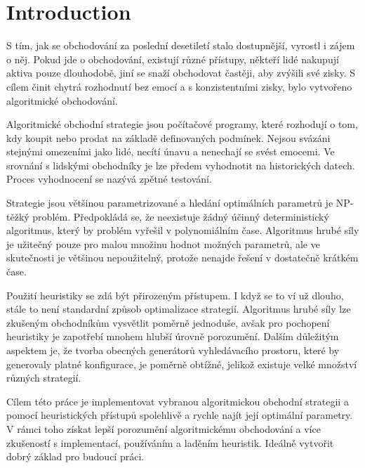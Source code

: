 \chapter*{Introduction}
\setcounter{page}{1}
S tím, jak se obchodování za poslední desetiletí stalo dostupnější, vyrostl i zájem o něj.
Pokud jde o obchodování, existují různé přístupy, někteří lidé nakupují aktiva pouze dlouhodobě, jiní se snaží obchodovat častěji, aby zvýšili své zisky.
S cílem činit chytrá rozhodnutí bez emocí a s konzistentními zisky, bylo vytvořeno algoritmické obchodování.

Algoritmické obchodní strategie jsou počítačové programy, které rozhodují o tom, kdy koupit nebo prodat na základě definovaných podmínek.
Nejsou svázáni stejnými omezeními jako lidé, necítí únavu a nenechají se svést emocemi.
Ve srovnání s lidskými obchodníky je lze předem vyhodnotit na historických datech.
Proces vyhodnocení se nazývá zpětné testování.

Strategie jsou většinou parametrizované a hledání optimálních parametrů je NP-těžký problém.
Předpokládá se, že neexistuje žádný účinný deterministický algoritmus, který by problém vyřešil v polynomiálním čase.
Algoritmus hrubé síly je užitečný pouze pro malou množinu hodnot možných parametrů, ale ve skutečnosti je většinou nepoužitelný, protože nenajde řešení v dostatečně krátkém čase.

Použití heuristiky se zdá být přirozeným přístupem.
I když se to ví už dlouho, stále to není standardní způsob optimalizace strategií.
Algoritmus hrubé síly lze zkušeným obchodníkům vysvětlit poměrně jednoduše, avšak pro pochopení heuristiky je zapotřebí mnohem hlubší úrovně porozumění.
Dalším důležitým aspektem je, že tvorba obecných generátorů vyhledávacího prostoru, které by generovaly platné konfigurace, je poměrně obtížné, jelikož existuje velké množství různých strategií.

Cílem této práce je implementovat vybranou algoritmickou obchodní strategii a pomocí heuristických přístupů spolehlivě a rychle najít její optimální parametry.
V rámci toho získat lepší porozumění algoritmickému obchodování a více zkušeností s implementací, používáním a laděním heuristik.
Ideálně vytvořit dobrý základ pro budoucí práci.

